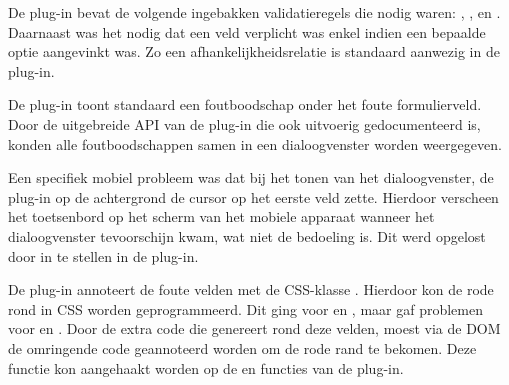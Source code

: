 De plug-in bevat de volgende ingebakken validatieregels die nodig waren: , ,  en .
Daarnaast was het nodig dat een veld verplicht was enkel indien een bepaalde optie aangevinkt was.
Zo een afhankelijkheidsrelatie is standaard aanwezig in de plug-in.

De plug-in toont standaard een foutboodschap onder het foute formulierveld.
Door de uitgebreide API van de plug-in die ook uitvoerig gedocumenteerd is, konden alle foutboodschappen samen in een dialoogvenster worden weergegeven.

Een specifiek mobiel probleem was dat bij het tonen van het dialoogvenster, de plug-in op de achtergrond de cursor op het eerste veld zette. 
Hierdoor verscheen het toetsenbord op het scherm van het mobiele apparaat wanneer het dialoogvenster tevoorschijn kwam, wat niet de bedoeling is. 
Dit werd opgelost door  in te stellen in de plug-in.

De plug-in annoteert de foute velden met de CSS-klasse .
Hierdoor kon de rode rond in CSS worden geprogrammeerd. 
Dit ging voor  en , maar gaf problemen voor  en .
Door de extra code die \jqm{} genereert rond deze velden, moest via de DOM de omringende code geannoteerd worden om de rode rand te bekomen. 
Deze functie kon aangehaakt worden op de  en  functies van de plug-in.


